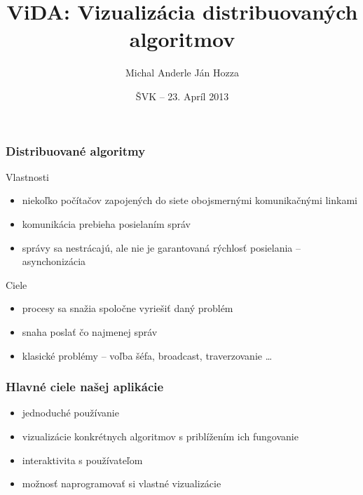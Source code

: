 \documentclass{beamer}
\title{ViDA: Vizualizácia distribuovaných algoritmov}
\author{Michal Anderle \newline Ján Hozza}
\date[ŠVK]{ŠVK -- 23. Apríl 2013}
\begin{document}
\begin{frame}
  \titlepage
\end{frame}

\begin{frame}
    \frametitle{Distribuované algoritmy}

    \begin{block}{Vlastnosti}
        \begin{itemize}
        \vfill\item niekoľko počítačov zapojených do siete obojsmernými komunikačnými linkami
        \vfill\item komunikácia prebieha posielaním správ
        \vfill\item správy sa nestrácajú, ale nie je garantovaná rýchlosť posielania --
        asynchonizácia
        \end{itemize}
    \end{block}

    \begin{block}{Ciele}
        \begin{itemize}
        \vfill\item procesy sa snažia spoločne vyriešiť daný problém
        \vfill\item snaha poslať čo najmenej správ
        \vfill\item klasické problémy -- voľba šéfa, broadcast, traverzovanie \dots
        \end{itemize}
    \end{block}

\end{frame}

\begin{frame}
    \frametitle{Hlavné ciele našej aplikácie}

    \begin{block}{}
        \begin{itemize}
            \vfill\item jednoduché používanie
            \vfill\item vizualizácie konkrétnych algoritmov s priblížením ich fungovanie
            \vfill\item interaktivita s používateľom
            \vfill\item možnosť naprogramovať si vlastné vizualizácie
        \end{itemize}
    \end{block}

\end{frame}
\end{document}

